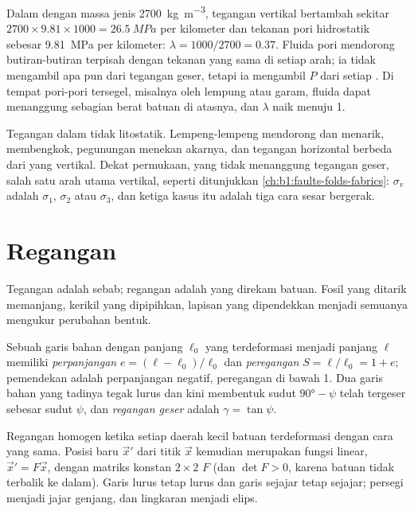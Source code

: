 Dalam  dengan massa jenis \qty{2700}{kg.m^{-3}}, tegangan vertikal bertambah sekitar $2700\times9.81\times1000 = \qty{26.5}{MPa}$ per kilometer dan tekanan pori hidrostatik sebesar \qty{9.81}{MPa} per kilometer: $\lambda = 1000/2700 = 0.37$. Fluida pori mendorong butiran-butiran terpisah dengan tekanan yang sama di setiap arah; ia tidak mengambil apa pun dari tegangan geser, tetapi ia mengambil $P$ dari setiap . Di tempat pori-pori tersegel, misalnya oleh lempung atau garam, fluida dapat menanggung sebagian berat batuan di atasnya, dan $\lambda$ naik menuju 1.

Tegangan dalam  tidak litostatik. Lempeng-lempeng mendorong dan menarik,  membengkok, pegunungan menekan akarnya, dan tegangan horizontal berbeda dari yang vertikal. Dekat permukaan, yang tidak menanggung tegangan geser, salah satu arah utama vertikal, seperti ditunjukkan \cref{ch:b1:faults-folds-fabrics}: $\sigma_v$ adalah $\sigma_1$, $\sigma_2$ atau $\sigma_3$, dan ketiga kasus itu adalah tiga cara sesar bergerak.

\section{Regangan}\label{sec:b1:stress-strain-rheology:strain}

Tegangan adalah sebab; regangan adalah yang direkam batuan. Fosil yang ditarik memanjang, kerikil yang dipipihkan, lapisan yang dipendekkan menjadi  semuanya mengukur perubahan bentuk.

\begin{definition}\label{def:b1:stress-strain-rheology:strain}
Sebuah garis bahan dengan panjang $\ell_0$ yang terdeformasi menjadi panjang $\ell$ memiliki \emph{perpanjangan} $e = (\ell - \ell_0)/\ell_0$ dan \emph{peregangan} $S = \ell/\ell_0 = 1 + e$; pemendekan adalah perpanjangan negatif, peregangan di bawah 1. Dua garis bahan yang tadinya tegak lurus dan kini membentuk sudut $\ang{90} - \psi$ telah tergeser sebesar sudut $\psi$, dan \emph{regangan geser} adalah $\gamma = \tan\psi$.
\end{definition}

Regangan homogen ketika setiap daerah kecil batuan terdeformasi dengan cara yang sama. Posisi baru $\vec x'$ dari titik $\vec x$ kemudian merupakan fungsi linear, $\vec x' = F\vec x$, dengan matriks konstan $2\times2$ $F$ (dan $\det F > 0$, karena batuan tidak terbalik ke dalam). Garis lurus tetap lurus dan garis sejajar tetap sejajar; persegi menjadi jajar genjang, dan lingkaran menjadi elips.

